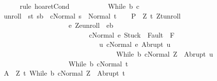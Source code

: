 \begin{isabellebody}
\ \ \ \ \isamarkupfalse%
\ {\isacharparenleft}rule\ hoaret{\isachardot}Cond{\isacharparenright}\ \ \ \ \ \ \ \isanewline
{}\isamarkupfalse%
\isanewline
\ \ \isamarkupfalse%
\ {\isacharparenleft}While\ b\ c{\isacharparenright}\isanewline
\ \ \isamarkupfalse%
\ {\isacharquery}unroll\ {\isacharequal}\ {\isachardoublequoteopen}{\isacharparenleft}{\isacharbraceleft}{\isacharparenleft}s{\isacharcomma}t{\isacharparenright}{\isachardot}\ s{\isasymin}b\ {\isasymand}\ {\isasymGamma}{\isasymturnstile}{\isasymlangle}c{\isacharcomma}Normal\ s{\isasymrangle}\ {\isasymRightarrow}\ Normal\ t{\isacharbraceright}{\isacharparenright}\isactrlsup {\isacharasterisk}{\isachardoublequoteclose}\isanewline
\ \ \isamarkupfalse%
\ {\isacharquery}P{\isacharprime}\ {\isacharequal}\ {\isachardoublequoteopen}{\isasymlambda}Z{\isachardot}\ {\isacharbraceleft}t{\isachardot}\ {\isacharparenleft}Z{\isacharcomma}t{\isacharparenright}{\isasymin}{\isacharquery}unroll\ {\isasymand}\ \isanewline
\ \ \ \ \ \ \ \ \ \ \ \ \ \ \ \ \ \ \ \ {\isacharparenleft}{\isasymforall}e{\isachardot}\ {\isacharparenleft}Z{\isacharcomma}e{\isacharparenright}{\isasymin}{\isacharquery}unroll\ {\isasymlongrightarrow}\ e{\isasymin}b\isanewline
\ \ \ \ \ \ \ \ \ \ \ \ \ \ \ \ \ \ \ \ \ \ \ \ \ {\isasymlongrightarrow}\ {\isasymGamma}{\isasymturnstile}{\isasymlangle}c{\isacharcomma}Normal\ e{\isasymrangle}\ {\isasymRightarrow}{\isasymnotin}{\isacharparenleft}{\isacharbraceleft}Stuck{\isacharbraceright}\ {\isasymunion}\ Fault\ {\isacharbackquote}\ {\isacharparenleft}{\isacharminus}F{\isacharparenright}{\isacharparenright}\ {\isasymand}\ \isanewline
\ \ \ \ \ \ \ \ \ \ \ \ \ \ \ \ \ \ \ \ \ \ \ \ \ \ \ \ \ {\isacharparenleft}{\isasymforall}u{\isachardot}\ {\isasymGamma}{\isasymturnstile}{\isasymlangle}c{\isacharcomma}Normal\ e{\isasymrangle}\ {\isasymRightarrow}Abrupt\ u\ {\isasymlongrightarrow}\ \isanewline
\ \ \ \ \ \ \ \ \ \ \ \ \ \ \ \ \ \ \ \ \ \ \ \ \ \ \ \ \ \ \ \ \ \ {\isasymGamma}{\isasymturnstile}{\isasymlangle}While\ b\ c{\isacharcomma}Normal\ Z{\isasymrangle}\ {\isasymRightarrow}\ Abrupt\ u{\isacharparenright}{\isacharparenright}\ {\isasymand}\isanewline
\ \ \ \ \ \ \ \ \ \ \ \ \ \ \ \ \ \ \ \ {\isasymGamma}{\isasymturnstile}{\isacharparenleft}While\ b\ c{\isacharparenright}{\isasymdown}Normal\ t{\isacharbraceright}{\isachardoublequoteclose}\isanewline
\ \ \isamarkupfalse%
\ {\isacharquery}A\ {\isacharequal}\ {\isachardoublequoteopen}{\isasymlambda}Z{\isachardot}\ {\isacharbraceleft}t{\isachardot}\ {\isasymGamma}{\isasymturnstile}{\isasymlangle}While\ b\ c{\isacharcomma}Normal\ Z{\isasymrangle}\ {\isasymRightarrow}\ Abrupt\ t{\isacharbraceright}{\isachardoublequoteclose}\isanewline

\end{isabellebody}
